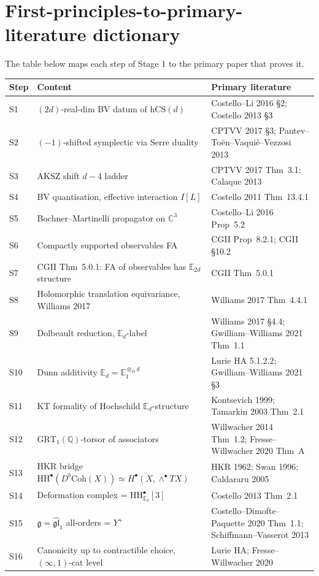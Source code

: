 \documentclass[11pt]{article}
\theoremstyle{definition}
\providecommand{\CC}{\mathbb{C}}
\providecommand{\QQ}{\mathbb{Q}}
\providecommand{\HH}{\mathrm{HH}}
\providecommand{\fg}{\mathfrak{g}}
\providecommand{\hCS}{\mathrm{hCS}}
\providecommand{\Coh}{\mathrm{Coh}}
\begin{document}
\section*{First-principles-to-primary-literature dictionary}

The table below maps each step of Stage 1 to the primary paper that
proves it.

\begin{center}
\small
\begin{tabular}{|l|l|l|}
\hline
\textbf{Step} & \textbf{Content} & \textbf{Primary literature} \\
\hline
S1 & $(2d)$-real-dim BV datum of $\hCS(d)$ & Costello--Li 2016 \S2; Costello 2013 \S3 \\
S2 & $(-1)$-shifted symplectic via Serre duality & CPTVV 2017 \S3; Pantev--To\"en--Vaqui\'e--Vezzosi 2013 \\
S3 & AKSZ shift $d - 4$ ladder & CPTVV 2017 Thm~3.1; Calaque 2013 \\
S4 & BV quantisation, effective interaction $I[L]$ & Costello 2011 Thm~13.4.1 \\
S5 & Bochner--Martinelli propagator on $\CC^3$ & Costello--Li 2016 Prop~5.2 \\
S6 & Compactly supported observables FA & CGII Prop~8.2.1; CGII \S10.2 \\
S7 & CGII Thm~5.0.1: FA of observables has $\mathbb{E}_{2d}$ structure & CGII Thm~5.0.1 \\
S8 & Holomorphic translation equivariance, Williams 2017 & Williams 2017 Thm~4.4.1 \\
S9 & Dolbeault reduction, $\mathbb{E}_d$-label & Williams 2017 \S4.4; Gwilliam--Williams 2021 Thm~1.1 \\
S10 & Dunn additivity $\mathbb{E}_d = \mathbb{E}_1^{\otimes_D d}$ & Lurie HA 5.1.2.2; Gwilliam--Williams 2021 \S3 \\
S11 & KT formality of Hochschild $\mathbb{E}_d$-structure & Kontsevich 1999; Tamarkin 2003 Thm~2.1 \\
S12 & $\mathrm{GRT}_1(\QQ)$-torsor of associators & Willwacher 2014 Thm~1.2; Fresse--Willwacher 2020 Thm~A \\
S13 & HKR bridge $\HH^\bullet(D^b\Coh(X)) \simeq H^\bullet(X, \wedge^\bullet TX)$ & HKR 1962; Swan 1996; Caldararu 2005 \\
S14 & Deformation complex = $\HH^\bullet_{\mathbb{E}_3}[3]$ & Costello 2013 Thm~2.1 \\
S15 & $\fg = \widehat{\mathfrak{gl}}_1$ all-orders = $Y^+$ & Costello--Dimofte--Paquette 2020 Thm~1.1; Schiffmann--Vasserot 2013 \\
S16 & Canonicity up to contractible choice, $(\infty,1)$-cat level & Lurie HA; Fresse--Willwacher 2020 \\
\hline
\end{tabular}
\end{center}
\end{document}
